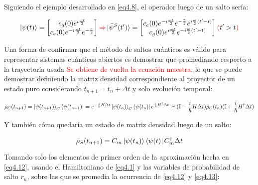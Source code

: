 \documentclass{book}
\begin{document}
Siguiendo el ejemplo desarrollado en \ref{eq4.8}, el operador luego de un salto sería:

\begin{equation}\label{eq4.11} \ket{\psi(t)}=\begin{bmatrix}c_g(0)e^{i\frac{\omega t}{2}}\\c_e(0)e^{-i\frac{\omega t}{2}}e^{-\frac{\gamma}{2}}\end{bmatrix} \textcolor{red}{\Rightarrow} \ket{\bar{\psi}^S(t^\prime)}=\begin{bmatrix}c_e(0)e^{-i\frac{\omega t}{2}}e^{-\frac{\gamma}{2}}e^{i\frac{\omega}{2}(t^\prime-t)}\\c_g(0)e^{i\frac{\omega t}{2}}e^{-i\frac{\omega}{2}(t^\prime-t)}\end{bmatrix}\textcolor{red}{(}t^\prime >t\textcolor{red}{)} \end{equation}


Una forma de confirmar que el método de saltos cuánticos es válido para representar sistemas cuánticos abiertos es demostrar que promediando respecto a la trayectoria usada \textcolor{red}{Se obtiene de vuelta la ecuación maestra}, lo que se puede demostrar definiendo la matriz densidad correspondiente al proyector de un estado puro considerando $t_{n+1}=t_n+\Delta t$ y solo evolución temporal:

\begin{equation}\label{eq4.12}\bar{\rho}_C(t_{n+1})=\ket{\psi(t_{n+1})}_C\bra{\psi(t_{n+1})}=e^{-\frac{i}{\hslash}H\Delta t}\ket{\psi(t_n)}_C\bra{\psi(t_n)}e^{\frac{i}{\hslash}H^\dag\Delta t}\simeq (\mathbb{I}-\frac{i}{\hslash}H\Delta t)\bar{\rho}_C(t_n)(\mathbb{I}+\frac{i}{\hslash}H^\dag\Delta t)\end{equation}

Y también cómo quedaría un estado de matriz densidad luego de un salto:

\begin{equation}\label{eq4.13}\bar{\rho}_S(t_{n+1})=C_m\ket{\psi(t_n)}\bra{\psi(t)}C_m^\dag \Delta t \end{equation}

Tomando solo los elementos de primer orden de la aproximación hecha en \ref{eq4.12}, usando el Hamiltoniano de \ref{eq4.1} y las variables de probabilidad de salto $r_n$, sobre las que se promedia la ocurrencia de \ref{eq4.12} y \ref{eq4.13}:
\end{document}
